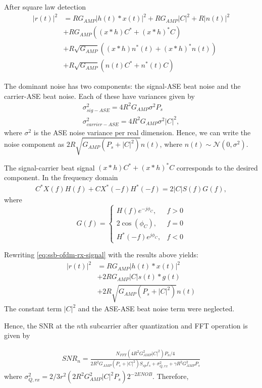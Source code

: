 \documentclass[a4paper]{article}
\begin{document}
After square law detection
\begin{align} \label{eq:ssb-ofdm-rx-signal} \nonumber
|r(t)|^2 &= RG_{AMP}|h(t)\ast x(t)|^2 + RG_{AMP}|C|^2 + R|n(t)|^2 \\ \nonumber
& + RG_{AMP}((x\ast h)C^* + (x\ast h)^*C)\\ \nonumber
& + R\sqrt{G_{AMP}}((x\ast h)n^*(t) + (x\ast h)^*n(t)) \\ 
& + R\sqrt{G_{AMP}}(n(t)C^* + n^*(t)C) 
\end{align}

The dominant noise has two components: the signal-ASE beat noise and the carrier-ASE beat noise. Each of these have variances given by
\begin{align}
\sigma^2_{sig-ASE} = 4R^2G_{AMP}\sigma^2P_s \\
\sigma^2_{carrier-ASE} = 4R^2G_{AMP}\sigma^2|C|^2,
\end{align}
where $\sigma^2$ is the ASE noise variance per real dimension. Hence, we can write the noise component as $2R\sqrt{G_{AMP}(P_s + |C|^2)}n(t)$, where $n(t)\sim\mathcal{N}(0, \sigma^2)$.

The signal-carrier beat signal $(x\ast h)C^* + (x\ast h)^*C$ corresponds to the desired component. In the frequency domain
\begin{align}
C^*X(f)H(f) + CX^*(-f)H^*(-f) = 2|C|S(f)G(f),
\end{align}
where 
\begin{equation}
G(f) = \begin{cases}
H(f)e^{-j\phi_C}, &f >0 \\
2\cos(\phi_C),& f = 0 \\
H^*(-f)e^{j\phi_C}, &f < 0
\end{cases}
\end{equation}

Rewriting \eqref{eq:ssb-ofdm-rx-signal} with the results above yields:
\begin{align}
|r(t)|^2 &= RG_{AMP}|h(t)\ast x(t)|^2 \\ \nonumber
& + 2RG_{AMP}|C|s(t)\ast g(t) \\
& + 2R\sqrt{G_{AMP}(P_s + |C|^2)}n(t) 
\end{align}
The constant term $|C|^2$ and the ASE-ASE beat noise term were neglected.

Hence, the SNR at the $n$th subcarrier after quantization and FFT operation is given by

\begin{align}
SNR_n = \frac{N_{FFT}(4R^2G_{AMP}^2|C|^2)P_n/4}{2R^2G_{AMP}(P_s + |C|^2)S_{sp}f_s + \sigma_{Q,rx}^2 + \gamma R^2G_{AMP}^2P_s}
\end{align}
where $\sigma_{Q,rx}^2 = 2/3r^2(2R^2G_{AMP}^2|C|^2P_s)2^{-2ENOB}$. Therefore,
\end{document}

